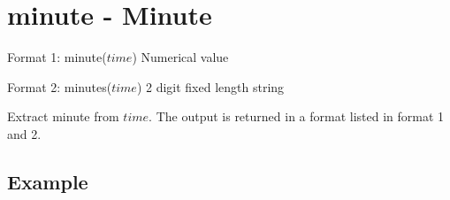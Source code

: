 
%

\section{minute - Minute\label{sect:minute}}

Format 1: minute($time$) Numerical value

Format 2: minutes($time$) 2 digit fixed length string 

Extract minute from $time$. The output is returned in a format listed in format 1 and 2. 

\subsection*{Example}


%

